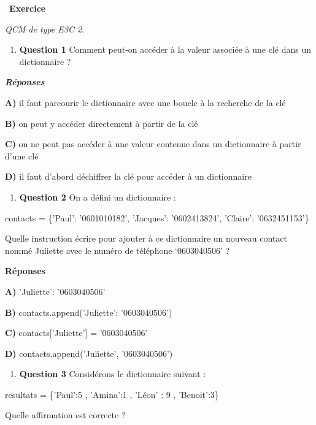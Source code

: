 \documentclass[
  11pt,
]{article}
\providecommand{\tightlist}{%
  \setlength{\itemsep}{0pt}\setlength{\parskip}{0pt}}
\newcounter{exo}
\newenvironment{exercice}[1]
{\par \medskip   \addtocounter{exo}{1} \noindent  
\begin{bclogo}[arrondi =0.1,   noborder = true, logo=\bccrayon, marge=4]{~\textbf{Exercice} \textbf{\theexo} {\itshape #1} }  \par}
{
\end{bclogo}
 \par \bigskip }
\newcounter{def}
\begin{document}
\begin{exercice}{}

\emph{QCM de type E3C 2}.

\begin{enumerate}
\def\labelenumi{\arabic{enumi}.}
\tightlist
\item
  \textbf{Question 1} Comment peut-on accéder à la valeur associée à une
  clé dans un dictionnaire ?
\end{enumerate}

\textbf{\emph{Réponses}}

\textbf{A)} il faut parcourir le dictionnaire avec une boucle à la
recherche de la clé

\textbf{B)} on peut y accéder directement à partir de la clé

\textbf{C)} on ne peut pas accéder à une valeur contenue dans un
dictionnaire à partir d'une clé

\textbf{D)} il faut d'abord déchiffrer la clé pour accéder à un
dictionnaire

\begin{enumerate}
\def\labelenumi{\arabic{enumi}.}
\setcounter{enumi}{1}
\tightlist
\item
  \textbf{Question 2} On a défini un dictionnaire :
\end{enumerate}

contacts = \{'Paul': '0601010182', 'Jacques': '0602413824', 'Claire':
'0632451153'\}

Quelle instruction écrire pour ajouter à ce dictionnaire un nouveau
contact nommé Juliette avec le numéro de téléphone `0603040506' ?

\textbf{Réponses}

\textbf{A)} 'Juliette': '0603040506'

\textbf{B)} contacts.append('Juliette': '0603040506')

\textbf{C)} contacts{[}'Juliette'{]} = '0603040506'

\textbf{D)} contacts.append('Juliette', '0603040506')

\begin{enumerate}
\def\labelenumi{\arabic{enumi}.}
\setcounter{enumi}{2}
\tightlist
\item
  \textbf{Question 3} Considérons le dictionnaire suivant :
\end{enumerate}

resultats = \{'Paul':5 , 'Amina':1 , 'Léon' : 9 , 'Benoit':3\}

Quelle affirmation est correcte ?


\end{exercice}
\end{document}
